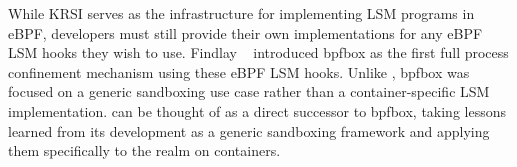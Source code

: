 While KRSI serves as the infrastructure for implementing LSM programs in eBPF, developers must still provide their own implementations for any eBPF LSM hooks they wish to use. Findlay \etal~\cite{findlay2020_bpfbox} introduced bpfbox as the first full process confinement mechanism using these eBPF LSM hooks. Unlike \bpfcontain{}, bpfbox was focused on a generic sandboxing use case rather than a container-specific LSM implementation. \bpfcontain{} can be thought of as a direct successor to bpfbox, taking lessons learned from its development as a generic sandboxing framework and applying them specifically to the realm on containers.
